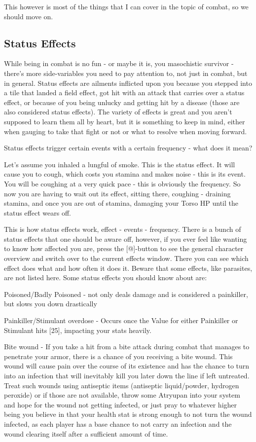 This however is most of the things that I can cover in the topic of combat, so we should move on.

\subsection{Status Effects}

While being in combat is no fun - or maybe it is, you masochistic survivor - there's more side-variables you need to pay attention to, not just in combat, but in general. Status effects are ailments inflicted upon you because you stepped into a tile that landed a field effect, got hit with an attack that carries over a status effect, or because of you being unlucky and getting hit by a disease (those are also considered status effects). The variety of effects is great and you aren't supposed to learn them all by heart, but it is something to keep in mind, either when gauging to take that fight or not or what to resolve when moving forward.

Status effects trigger certain events with a certain frequency - what does it mean?

Let's assume you inhaled a lungful of smoke. This is the status effect. It will cause you to cough, which costs you stamina and makes noise - this is its event. You will be coughing at a very quick pace - this is obviously the frequency. So now you are having to wait out its effect, sitting there, coughing - draining stamina, and once you are out of stamina, damaging your Torso HP until the status effect wears off.

This is how status effects work, effect - events - frequency. There is a bunch of status effects that one should be aware off, however, if you ever feel like wanting to know how affected you are, press the [@]-button to see the general character overview and switch over to the current effects window. There you can see which effect does what and how often it does it. Beware that some effects, like parasites, are not listed here. Some status effects you should know about are:

Poisoned/Badly Poisoned - not only deals damage and is considered a painkiller, but slows you down drastically

Painkiller/Stimulant overdose - Occurs once the Value for either Painkiller or Stimulant hits [25], impacting your stats heavily.

Bite wound - If you take a hit from a bite attack during combat that manages to penetrate your armor, there is a chance of you receiving a bite wound. This wound will cause pain over the course of its existence and has the chance to turn into an infection that will inevitably kill you later down the line if left untreated. Treat such wounds using antiseptic items (antiseptic liquid/powder, hydrogen peroxide) or if those are not available, throw some Atryupan into your system and hope for the wound not getting infected, or just pray to whatever higher being you believe in that your health stat is strong enough to not turn the wound infected, as each player has a base chance to not carry an infection and the wound clearing itself after a sufficient amount of time.

